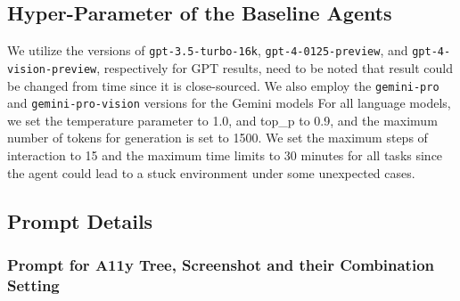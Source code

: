 \subsection{Hyper-Parameter of the Baseline Agents}
\label{app:prompting_details}
We utilize the versions of \texttt{gpt-3.5-turbo-16k}, \texttt{gpt-4-0125-preview}, and \texttt{gpt-4-vision-preview}, respectively for GPT results, need to be noted that result could be changed from time since it is close-sourced.
We also employ the \texttt{gemini-pro} and \texttt{gemini-pro-vision} versions for the Gemini models 
For all language models, we set the temperature parameter to 1.0, and top\_p to 0.9, and the maximum number of tokens for generation is set to 1500. 
We set the maximum steps of interaction to 15 and the maximum time limits to 30 minutes for all tasks since the agent could lead to a stuck environment under some unexpected cases.

\subsection{Prompt Details}

\subsubsection{Prompt for A11y Tree, Screenshot and their Combination Setting}

